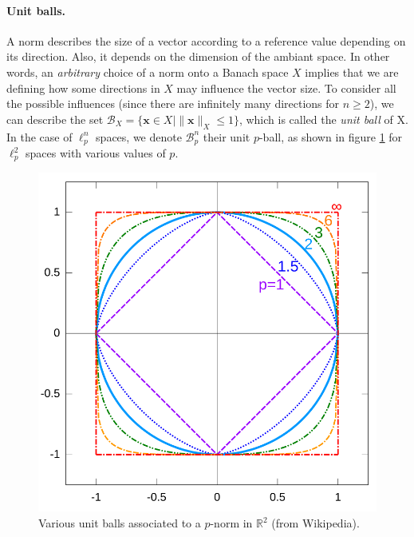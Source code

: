 \paragraph*{Unit balls.} A norm describes the size of a vector according to a reference value depending on its direction. Also, it depends on the dimension of the ambiant space. In other words, an \emph{arbitrary} choice of a norm onto a Banach space $X$ implies that we are defining how some directions in $X$ may influence the vector size. To consider all the possible influences (since there are infinitely many directions for $n\geq 2$), we can describe the set $\mathcal{B}_X = \{\mathbf{x}\in X \mid \|\mathbf{x}\|_X \leq 1 \}$, which is called the \emph{unit ball} of X. In the case of $\ell_p^n$ spaces, we denote $\mathcal{B}_p^n$ their unit $p$-ball, as shown in figure \ref{fig:pnorms} for $\ell_p^2$ spaces with various values of $p$.
\begin{figure}[!htb]
    \captionsetup{justification=centering}
        \centering
        \includegraphics[trim={0 0 0 0}, clip, width=0.4\linewidth]{img/chapter_3/p_norms.png}
    \caption{Various unit balls associated to a $p$-norm in $\mathbb{R}^2$ (from Wikipedia).}
    \label{fig:pnorms}
\end{figure}



